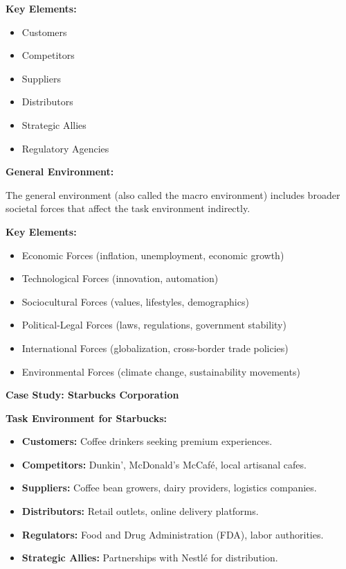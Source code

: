 \documentclass[10pt,a4paper]{book}
\begin{document}
\textbf{Key Elements:}
\begin{itemize}
    \item Customers
    \item Competitors
    \item Suppliers
    \item Distributors
    \item Strategic Allies
    \item Regulatory Agencies
\end{itemize}

\vspace{0.5cm}

\textbf{General Environment:}

The general environment (also called the macro environment) includes broader societal forces that affect the task environment indirectly.

\textbf{Key Elements:}
\begin{itemize}
    \item Economic Forces (inflation, unemployment, economic growth)
    \item Technological Forces (innovation, automation)
    \item Sociocultural Forces (values, lifestyles, demographics)
    \item Political-Legal Forces (laws, regulations, government stability)
    \item International Forces (globalization, cross-border trade policies)
    \item Environmental Forces (climate change, sustainability movements)
\end{itemize}

\vspace{0.8cm}

\textbf{Case Study: Starbucks Corporation}

\textbf{Task Environment for Starbucks:}
\begin{itemize}
    \item \textbf{Customers:} Coffee drinkers seeking premium experiences.
    \item \textbf{Competitors:} Dunkin', McDonald's McCafé, local artisanal cafes.
    \item \textbf{Suppliers:} Coffee bean growers, dairy providers, logistics companies.
    \item \textbf{Distributors:} Retail outlets, online delivery platforms.
    \item \textbf{Regulators:} Food and Drug Administration (FDA), labor authorities.
    \item \textbf{Strategic Allies:} Partnerships with Nestlé for distribution.
\end{itemize}
\end{document}
